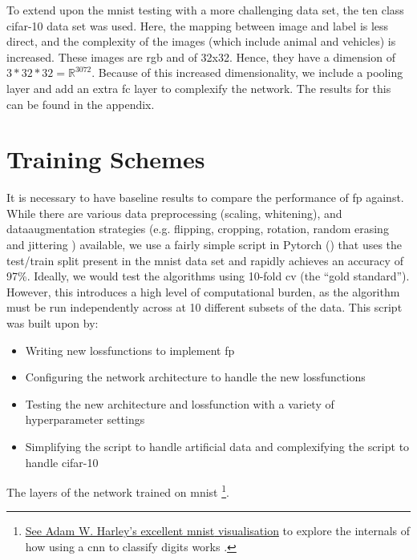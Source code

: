 To extend upon the \gls{mnist} testing with a more challenging data set, the ten class \gls{cifar}-10 data set was used. Here, the mapping between image and label is less direct, and the complexity of the images (which include animal and vehicles) is increased. These images are \gls{rgb} and of 32x32. Hence, they have a dimension of $3 * 32 * 32 = \mathds{R}^{3072}$. Because of this increased dimensionality, we include a pooling layer and add an extra \gls{fc} layer to complexify the network. The results for this can be found in the appendix.
\bigskip

%

\section{Training Schemes}
It is necessary to have baseline results to compare the performance of \gls{fp} against. While there are various data preprocessing (scaling, whitening), and \gls{dataaugmentation} strategies (e.g. flipping, cropping, rotation, random erasing and jittering \cite{data_aug_survey}) available, we use a fairly simple script in Pytorch (\cite{mnist_script}) that uses the test/train split present in the  \gls{mnist} data set and rapidly achieves an accuracy of 97\%. Ideally, we would test the algorithms using 10-fold \gls{cv} (the \enquote{gold standard}). However, this introduces a high level of computational burden, as the algorithm must be run independently across at 10 different subsets of the data. This script was built upon by:

\begin{itemize}
    \item Writing new \gls{lossfunction}s to implement \gls{fp}
    \item Configuring the network architecture to handle the new \gls{lossfunction}s
    \item Testing the new architecture and \gls{lossfunction} with a variety of \gls{hyperparameter} settings
    \item Simplifying the script to handle artificial data and complexifying the script to handle \gls{cifar}-10
\end{itemize}

The layers of the network trained on \gls{mnist} \footnote{\href{https://www.cs.ryerson.ca/~aharley/vis/conv/}{See Adam W. Harley's excellent \gls{mnist} visualisation} to explore the internals of how using a \gls{cnn} to classify digits works \cite{mnist_viz}.}. 

